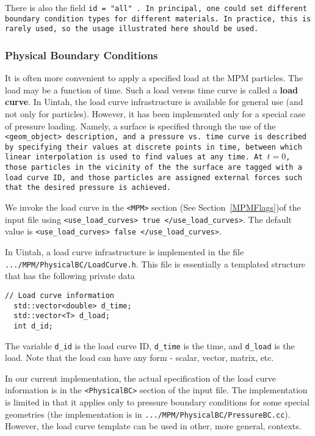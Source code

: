There is also the field \tt id = "all" \normalfont.  In principal, one could
set different boundary condition types for different materials.  In practice,
this is rarely used, so the usage illustrated here should be used.

\subsubsection{Physical Boundary Conditions} \label{PhysicalBCs}

It is often more convenient to apply a specified load at the MPM particles.
The load may be a function of time.  Such a load versus time curve is called
a {\bf load curve}.
In Uintah, the load curve infrastructure is available for general use
(and not only for particles).  However, it has been implemented only for
a special case of pressure loading.  Namely, a surface is
specified through the use of the \tt <geom\_object> \normalfont description,
and a pressure vs. time curve is described by specifying their values
at discrete points in time, between which linear interpolation is used
to find values at any time.  At $t=0$, those particles in the vicinity
of the the surface are tagged with a load curve ID, and those particles
are assigned external forces such that the desired pressure is achieved.

We invoke the load curve in the \verb|<MPM>| section
(See Section~\ref{MPMFlags})of the input file
using  \verb|<use_load_curves> true </use_load_curves>|.  The default value
is \verb|<use_load_curves> false </use_load_curves>|.

In Uintah, a load curve infrastructure is implemented in the file \\
\verb|.../MPM/PhysicalBC/LoadCurve.h|.  This file is essentially a templated
structure that has the following private data
\begin{Verbatim}[fontsize=\footnotesize]
  // Load curve information 
  std::vector<double> d_time;
  std::vector<T> d_load;
  int d_id;
\end{Verbatim}
The variable \verb|d_id| is the load curve ID, \verb|d_time| is the time,
and \verb|d_load| is the load.  Note that the load can have any form - scalar,
vector, matrix, etc.

In our current implementation, the actual specification of the load curve
information is in the \verb|<PhysicalBC>| section of the input file.  The
implementation is limited in that it applies only to pressure boundary
conditions for some special geometries (the implementation is in
\verb|.../MPM/PhysicalBC/PressureBC.cc|).  However, the load curve template can
be used in other, more general, contexts.

